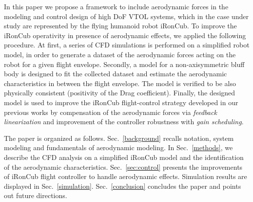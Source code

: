 In this paper we propose a framework to include aerodynamic forces in the modeling and control design of high DoF VTOL systems, which in the case under study are represented by the flying humanoid robot iRonCub. 
%
To improve the iRonCub operativity in presence of aerodynamic effects, we applied the following procedure. At first, a series of CFD simulations is performed on a simplified robot model, in order to generate a dataset of the aerodynamic forces acting on the robot for a given flight envelope. Secondly, a model for a non-axisymmetric bluff body is designed to fit the collected dataset and estimate the aerodynamic characteristics in between the flight envelope. The model is verified to be also physically consistent (positivity of the Drag coefficient). Finally, the designed model is used to improve the iRonCub flight-control strategy developed in our previous works \cite{c1}\cite{c2} by compensation of the aerodynamic forces via \emph{feedback linearization} and improvement of the controller robustness with \emph{gain scheduling}.


The paper is organized as follows. Sec.~\ref{background} recalls notation, system modeling and fundamentals of aerodynamic modeling. In Sec.~\ref{methods}, we describe the CFD analysis on a simplified iRonCub model and the identification of the aerodynamic characteristics. Sec.~\ref{sec:control} presents the improvements of iRonCub flight controller to handle aerodynamic effects. Simulation results are displayed in Sec.~\ref{simulation}. Sec.~\ref{conclusion} concludes the paper and points out future directions.

